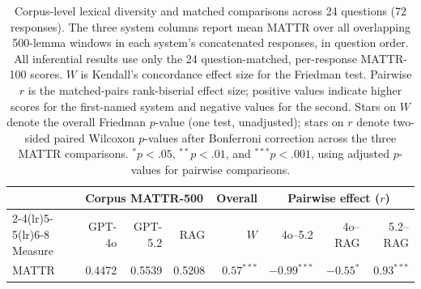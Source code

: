 \begin{table}[tbp]
\centering
\caption{Corpus-level lexical diversity and matched comparisons across
24 questions (72 responses). The three system columns report mean MATTR
over all overlapping 500-lemma windows in each system's concatenated
responses, in question order. All inferential results use only the
24 question-matched, per-response MATTR-100 scores. $W$ is Kendall's
concordance effect size for the Friedman test. Pairwise $r$ is the
matched-pairs rank-biserial effect size; positive values indicate higher
scores for the first-named system and negative values for the second.
Stars on $W$ denote the overall Friedman $p$-value (one test, unadjusted);
stars on $r$ denote two-sided paired Wilcoxon $p$-values after Bonferroni
correction across the three MATTR comparisons.
$^{*}p<.05$, $^{**}p<.01$, and $^{***}p<.001$, using adjusted $p$-values
for pairwise comparisons.}
\label{tab:mattr}
\small
\setlength{\tabcolsep}{4pt}
\begin{tabular}{lrrrrrrr}
\toprule
 & \multicolumn{3}{c}{Corpus MATTR-500}
 & \multicolumn{1}{c}{Overall}
 & \multicolumn{3}{c}{Pairwise effect ($r$)} \\
\cmidrule(lr){2-4}\cmidrule(lr){5-5}\cmidrule(lr){6-8}
Measure & GPT-4o & GPT-5.2 & RAG & $W$
 & 4o--5.2 & 4o--RAG & 5.2--RAG \\
\midrule
MATTR & 0.4472 & 0.5539 & 0.5208 & $0.57^{***}$ & $-0.99^{***}$ & $-0.55^{*}$ & $0.93^{***}$ \\
\bottomrule
\end{tabular}
\end{table}
